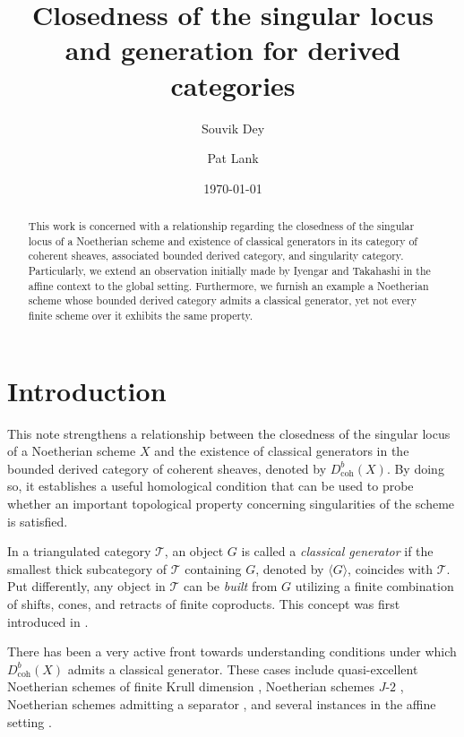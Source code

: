 \documentclass[11pt]{amsart}
\title[Closedness of singular locus and generation]{Closedness of the singular locus \\ and generation for derived categories}
\author[S.~Dey]{Souvik Dey}
\author[P.~Lank]{Pat Lank}
\date{\today}
\newcounter{intro}
\theoremstyle{plain}
\theoremstyle{definition}
\numberwithin{equation}{section}
\numberwithin{theorem}{section}
\begin{document}
    
\begin{abstract}
    This work is concerned with a relationship regarding the closedness of the singular locus of a Noetherian scheme and existence of classical generators in its category of coherent sheaves, associated bounded derived category, and singularity category. Particularly, we extend an observation initially made by Iyengar and Takahashi in the affine context to the global setting. Furthermore, we furnish an example a Noetherian scheme whose bounded derived category admits a classical generator, yet not every finite scheme over it exhibits the same property.
\end{abstract}

\maketitle

\section{Introduction}
\label{sec:introduction}

This note strengthens a relationship between the closedness of the singular locus of a Noetherian scheme $X$ and the existence of classical generators in the bounded derived category of coherent sheaves, denoted by $D^b_{\operatorname{coh}}(X)$. By doing so, it establishes a useful homological condition that can be used to probe whether an important topological property concerning singularities of the scheme is satisfied.

In a triangulated category $\mathcal{T}$, an object $G$ is called a \textit{classical generator} if the smallest thick subcategory of $\mathcal{T}$ containing $G$, denoted by $\langle G \rangle$, coincides with $\mathcal{T}$. Put differently, any object in $\mathcal{T}$ can be \textit{built} from $G$ utilizing a finite combination of shifts, cones, and retracts of finite coproducts. This concept was first introduced in \cite{BVdB:2003}.

There has been a very active front towards understanding conditions under which $D^b_{\operatorname{coh}} (X)$ admits a classical generator. These cases include quasi-excellent Noetherian schemes of finite Krull dimension \cite{Aoki:2021}, Noetherian schemes $J\textrm{-}2$ \cite{Elagin/Lunts/Schnurer:2020}, Noetherian schemes admitting a separator \cite{Jatoba:2021}, and several instances in the affine setting \cite{Dey/Lank/Takahashi:2023,Olander:2023,Iyengar/Takahashi:2016,Iyengar/Takahashi:2019}. 
\end{document}
